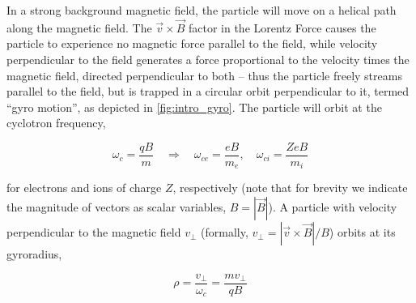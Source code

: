 \begin{figure}
 \pushtooutside
\end{figure}

\noindent In a strong background magnetic field, the particle will move on a helical path along the magnetic field.  The $\vec{v} \times \vec{B}$ factor in the Lorentz Force causes the particle to experience no magnetic force parallel to the field, while velocity perpendicular to the field generates a force proportional to the velocity times the magnetic field, directed perpendicular to both -- thus the particle freely streams parallel to the field, but is trapped in a circular orbit perpendicular to it, termed ``gyro motion'', as depicted in \cref{fig:intro_gyro}.  The particle will orbit at the cyclotron frequency,

\begin{equation}\label{eq:omegac}
 \omega_c = \frac{qB}{m} \quad\Rightarrow\quad \omega_{ce} = \frac{eB}{m_e}, \quad \omega_{ci} = \frac{ZeB}{m_i}
\end{equation}

\noindent for electrons and ions of charge $Z$, respectively (note that for brevity we indicate the magnitude of vectors as scalar variables, \eg $B = \left|\vec{B}\right|$).  A particle with velocity perpendicular to the magnetic field $v_\perp$ (formally, $v_\perp = \left|\vec{v} \times \vec{B}\right|/B$) orbits at its gyroradius,

\begin{equation}\label{eq:gyroradius}
 \rho = \frac{v_\perp}{\omega_c} = \frac{mv_\perp}{qB}
\end{equation}

